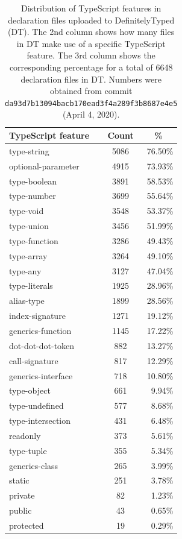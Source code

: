 \documentclass[sigconf]{acmart}
\begin{document}
\begin{table}[tp]
  \caption{Distribution of TypeScript features in declaration files uploaded to DefinitelyTyped (DT). The 2nd column shows how many files in DT make use of a specific TypeScript feature. The 3rd column shows the corresponding percentage for a total of 6648 declaration files in DT. Numbers were obtained from commit \texttt{da93d7b13094bacb170ead3f4a289f3b8687e4e5} (April 4, 2020).}
  \begin{center}
    \begin{tabular}{ |l|c|r| } 
      \hline
      \textbf{TypeScript feature} & \textbf{Count} & \multicolumn{1}{|c|}{\textbf{\%}} \\ 
      \hline
      type-string & 5086 & 76.50\% \\
      optional-parameter & 4915 & 73.93\% \\
      type-boolean & 3891 & 58.53\% \\
      type-number & 3699 & 55.64\% \\
      type-void & 3548 & 53.37\% \\
      type-union & 3456 & 51.99\% \\
      type-function & 3286 & 49.43\% \\
      type-array & 3264 & 49.10\% \\
      type-any & 3127 & 47.04\% \\
      type-literals & 1925 & 28.96\% \\
      alias-type & 1899 & 28.56\% \\
      index-signature & 1271 & 19.12\% \\
      generics-function & 1145 & 17.22\% \\
      dot-dot-dot-token & 882 & 13.27\% \\
      call-signature & 817 & 12.29\% \\
      generics-interface & 718 & 10.80\% \\
      type-object & 661 & 9.94\% \\
      type-undefined & 577 & 8.68\% \\
      type-intersection & 431 & 6.48\% \\
      readonly & 373 & 5.61\% \\
      type-tuple & 355 & 5.34\% \\
      generics-class & 265 & 3.99\% \\
      static & 251 & 3.78\% \\
      private & 82 & 1.23\% \\
      public & 43 & 0.65\% \\
      protected & 19 & 0.29\% \\
      \hline
    \end{tabular}
  \end{center}
  \label{tab:dts-parse-stats}
\end{table}
\end{document}
